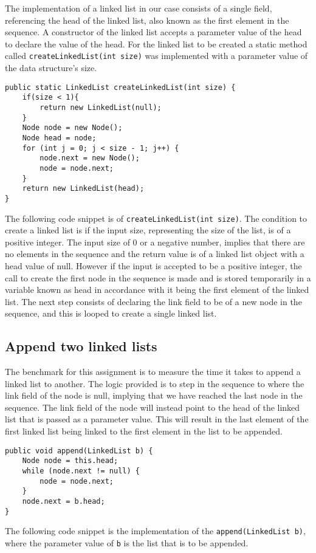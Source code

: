 \documentclass[a4paper,11pt]{article}
\begin{document}
        The implementation of a linked list in our case consists of a single field, referencing the head of the linked list, also known as the first element in the sequence. A constructor of the linked list accepts a parameter value of the head to declare the value of the head. For the linked list to be created a static method called \texttt{createLinkedList(int size)} was implemented with a parameter value of the data structure's size.
\begin{verbatim}
public static LinkedList createLinkedList(int size) {
    if(size < 1){
        return new LinkedList(null);
    }
    Node node = new Node();
    Node head = node;
    for (int j = 0; j < size - 1; j++) {
        node.next = new Node();
        node = node.next;
    }
    return new LinkedList(head);
}
\end{verbatim}
        The following code snippet is of \texttt{createLinkedList(int size)}. The condition to create a linked list is if the input size, representing the size of the list, is of a positive integer. The input size of 0 or a negative number, implies that there are no elements in the sequence and the return value is of a linked list object with a head value of null. However if the input is accepted to be a positive integer, the call to create the first node in the sequence is made and is stored temporarily in a variable known as head in accordance with it being the first element of the linked list. The next step consists of declaring the link field to be of a new node in the sequence, and this is looped to create a single linked list.

    \subsection*{Append two linked lists}

        The benchmark for this assignment is to measure the time it takes to append a linked list to another. The logic provided is to step in the sequence to where the link field of the node is null, implying that we have reached the last node in the sequence. The link field of the node will instead point to the head of the linked list that is passed as a parameter value. This will result in the last element of the first linked list being linked to the first element in the list to be appended.
\begin{verbatim}
public void append(LinkedList b) {
    Node node = this.head;
    while (node.next != null) {
        node = node.next;
    }
    node.next = b.head;
}
\end{verbatim}
        The following code snippet is the implementation of the \texttt{append(LinkedList b)}, where the parameter value of \texttt{b} is the list that is to be appended. 
    
\end{document}
